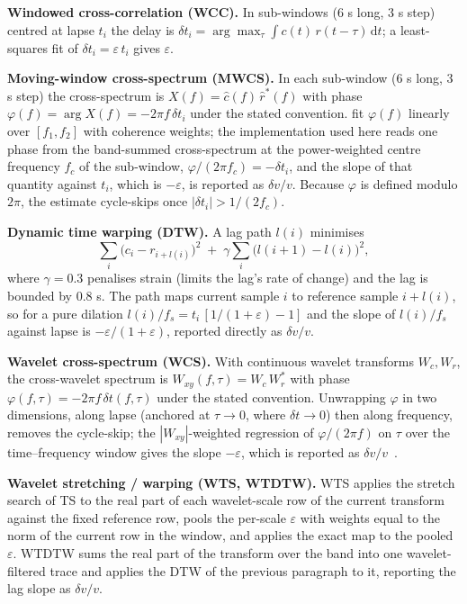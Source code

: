 \documentclass[
  referee]{gji}
\providecommand{\dvv}{\ensuremath{\delta v/v}}
\begin{document}
\textbf{Windowed cross-correlation (WCC).} In sub-windows (6 s long, 3 s
step) centred at lapse \(t_i\) the delay is
\(\delta t_i=\arg\max_{\tau}\int c(t)\,r(t-\tau)\,\mathrm{d}t\); a
least-squares fit of \(\delta t_i=\varepsilon\,t_i\) gives
\(\varepsilon\).

\textbf{Moving-window cross-spectrum (MWCS).} In each sub-window (6 s
long, 3 s step) the cross-spectrum is \(X(f)=\hat c(f)\,\hat r^{*}(f)\)
with phase \(\varphi(f)=\arg X(f)=-2\pi f\,\delta t_i\) under the stated
convention. \citet{Clarke2011} fit \(\varphi(f)\) linearly over
\([f_1,f_2]\) with coherence weights; the implementation used here reads
one phase from the band-summed cross-spectrum at the power-weighted
centre frequency \(f_c\) of the sub-window,
\(\varphi/(2\pi f_c)=-\delta t_i\), and the slope of that quantity
against \(t_i\), which is \(-\varepsilon\), is reported as \dvv. Because
\(\varphi\) is defined modulo \(2\pi\), the estimate cycle-skips once
\(|\delta t_i|>1/(2f_c)\).

\textbf{Dynamic time warping (DTW).} A lag path \(l(i)\) minimises
\begin{equation}
\sum_i \big(c_i - r_{i+l(i)}\big)^2 \;+\; \gamma\sum_i \big(l(i{+}1)-l(i)\big)^2,
\end{equation} where \(\gamma=0.3\) penalises strain (limits the lag's
rate of change) and the lag is bounded by \(0.8\) s. The path maps
current sample \(i\) to reference sample \(i+l(i)\), so for a pure
dilation \(l(i)/f_s=t_i\,[1/(1+\varepsilon)-1]\) and the slope of
\(l(i)/f_s\) against lapse is \(-\varepsilon/(1+\varepsilon)\), reported
directly as \dvv.

\textbf{Wavelet cross-spectrum (WCS).} With continuous wavelet
transforms \(W_c,W_r\), the cross-wavelet spectrum is
\(W_{xy}(f,\tau)=W_c\,W_r^{*}\) with phase
\(\varphi(f,\tau)=-2\pi f\,\delta t(f,\tau)\) under the stated
convention. Unwrapping \(\varphi\) in two dimensions, along lapse
(anchored at \(\tau\!\to\!0\), where \(\delta t\!\to\!0\)) then along
frequency, removes the cycle-skip; the \(|W_{xy}|\)-weighted regression
of \(\varphi/(2\pi f)\) on \(\tau\) over the time--frequency window
gives the slope \(-\varepsilon\), which is reported as
\dvv~\citep{Mao2020}.

\textbf{Wavelet stretching / warping (WTS, WTDTW).} WTS applies the
stretch search of TS to the real part of each wavelet-scale row of the
current transform against the fixed reference row, pools the per-scale
\(\varepsilon\) with weights equal to the norm of the current row in the
window, and applies the exact map to the pooled \(\varepsilon\). WTDTW
sums the real part of the transform over the band into one
wavelet-filtered trace and applies the DTW of the previous paragraph to
it, reporting the lag slope as \dvv.
\end{document}
